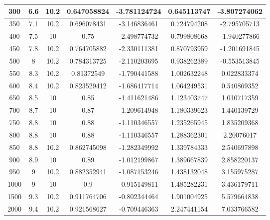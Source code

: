 \documentclass[a4paper,11pt]{jsarticle}
\begin{document}
\begin{center}
\begin{longtable}{|c|c|c|c|c|c|c|}
    300                 & 6.6       & 10.2     & 0.647058824 & -3.781124724 & 0.645113747 & -3.807274062 \\ \hline
    350                 & 7.1       & 10.2     & 0.696078431 & -3.146836461 & 0.724794208 & -2.795705713 \\ \hline
    400                 & 7.5       & 10       & 0.75        & -2.498774732 & 0.799808668 & -1.940277866 \\ \hline
    450                 & 7.8       & 10.2     & 0.764705882 & -2.330111381 & 0.870793959 & -1.201691845 \\ \hline
    500                 & 8         & 10.2     & 0.784313725 & -2.110203695 & 0.938262389 & -0.553513845 \\ \hline
    550                 & 8.3       & 10.2     & 0.81372549  & -1.790441588 & 1.002632248 & 0.022833374  \\ \hline
    600                 & 8.4       & 10.2     & 0.823529412 & -1.686417714 & 1.064249531 & 0.540869352  \\ \hline
    650                 & 8.5       & 10       & 0.85        & -1.411621486 & 1.123403747 & 1.010717359  \\ \hline
    700                 & 8.7       & 10       & 0.87        & -1.209614948 & 1.180339623 & 1.440139729  \\ \hline
    750                 & 8.8       & 10       & 0.88        & -1.110346557 & 1.235265945 & 1.835209368  \\ \hline
    800                 & 8.8       & 10       & 0.88        & -1.110346557 & 1.288362301 & 2.20076017   \\ \hline
    850                 & 8.8       & 10.2     & 0.862745098 & -1.282349992 & 1.339784333 & 2.540697898  \\ \hline
    900                 & 8.9       & 10       & 0.89        & -1.012199867 & 1.389667839 & 2.858220137  \\ \hline
    950                 & 9         & 10.2     & 0.882352941 & -1.087153246 & 1.438132048 & 3.155975287  \\ \hline
    1000                & 9         & 10       & 0.9         & -0.915149811 & 1.485282231 & 3.436179711  \\ \hline
    1500                & 9.3       & 10.2     & 0.911764706 & -0.802344464 & 1.901004925 & 5.579664838  \\ \hline
    2000                & 9.4       & 10.2     & 0.921568627 & -0.709446363 & 2.247441154 & 7.033766582  \\ \hline

\end{longtable}
\end{center}
\end{document}
